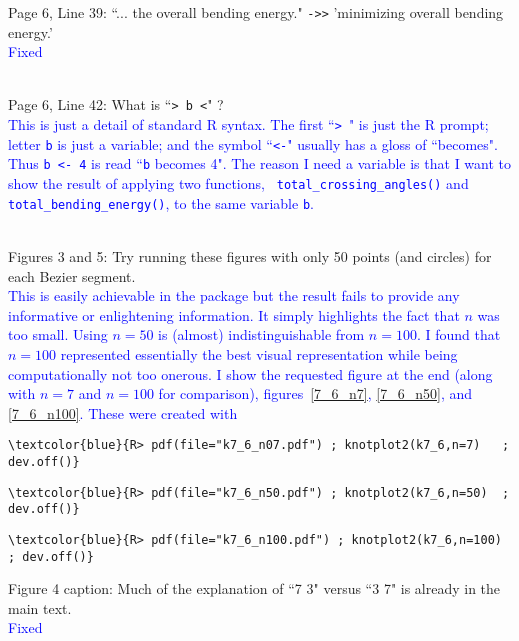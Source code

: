 \documentclass[12pt]{article}
\begin{document}
Page 6, Line 39: ``... the overall bending energy." {\tt ->>} 'minimizing
overall bending energy.'
\textcolor{blue}{\\Fixed\\ \\}

Page 6, Line 42: What is ``{\tt > b <}" ?  \textcolor{blue}{\\ This is
  just a detail of standard R syntax.  The first ``{\tt > }" is just
  the R prompt; letter {\tt b} is just a variable; and the symbol
  ``{\tt <-}" usually has a gloss of ``becomes".  Thus {\tt b <- 4} is
  read ``{\tt b} becomes 4". The reason I need a variable is that I
  want to show the result of applying two functions, {\tt
    total\_crossing\_angles()} and {\tt total\_bending\_energy()}, to
  the same variable {\tt b}.\\ \\}


Figures 3 and 5: Try running these figures with only 50 points (and
circles) for each Bezier segment. \textcolor{blue}{\\This is easily
  achievable in the package but the result fails to provide any
  informative or enlightening information.  It simply highlights the
  fact that $n$ was too small.  Using $n=50$ is (almost)
  indistinguishable from $n=100$.  I found that $n=100$ represented
  essentially the best visual representation while being
  computationally not too onerous.  I show the requested figure at the
  end (along with $n=7$ and $n=100$ for comparison),
  figures~\ref{7_6_n7}, \ref{7_6_n50}, and \ref{7_6_n100}.  These were
  created with}

\begin{Verbatim}[commandchars=\\\{\}]
\textcolor{blue}{R> pdf(file="k7_6_n07.pdf") ; knotplot2(k7_6,n=7)   ; dev.off()}
\end{Verbatim}
\begin{Verbatim}[commandchars=\\\{\}]
\textcolor{blue}{R> pdf(file="k7_6_n50.pdf") ; knotplot2(k7_6,n=50)  ; dev.off()}
\end{Verbatim}
\begin{Verbatim}[commandchars=\\\{\}]
\textcolor{blue}{R> pdf(file="k7_6_n100.pdf") ; knotplot2(k7_6,n=100) ; dev.off()}
\end{Verbatim}


Figure 4 caption: Much of the explanation of ``7 3" versus ``3 7" is
already in the main text.  \textcolor{blue}{\\Fixed\\ \\}
\end{document}
